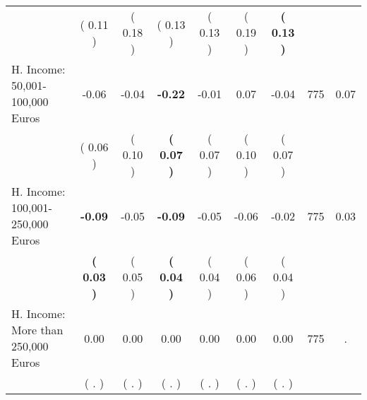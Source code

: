 \begin{tabular}{lcccccccc}
 & (     0.11 ) & (     0.18 ) & (     0.13 ) & (     0.13 ) & (     0.19 ) & \textbf{(     0.13 )} & \\
H. Income: 50,001-100,000 Euros &     -0.06 &     -0.04 & \textbf{    -0.22} &     -0.01 &      0.07 &     -0.04 & 775 &       0.07 \\ 
 & (     0.06 ) & (     0.10 ) & \textbf{(     0.07 )} & (     0.07 ) & (     0.10 ) & (     0.07 ) & \\
H. Income: 100,001-250,000 Euros & \textbf{    -0.09} &     -0.05 & \textbf{    -0.09} &     -0.05 &     -0.06 &     -0.02 & 775 &       0.03 \\ 
 & \textbf{(     0.03 )} & (     0.05 ) & \textbf{(     0.04 )} & (     0.04 ) & (     0.06 ) & (     0.04 ) & \\
H. Income: More than 250,000 Euros &      0.00 &      0.00 &      0.00 &      0.00 &      0.00 &      0.00 & 775 &          . \\ 
 & (        . ) & (        . ) & (        . ) & (        . ) & (        . ) & (        . ) & \\
\bottomrule
\end{tabular}
